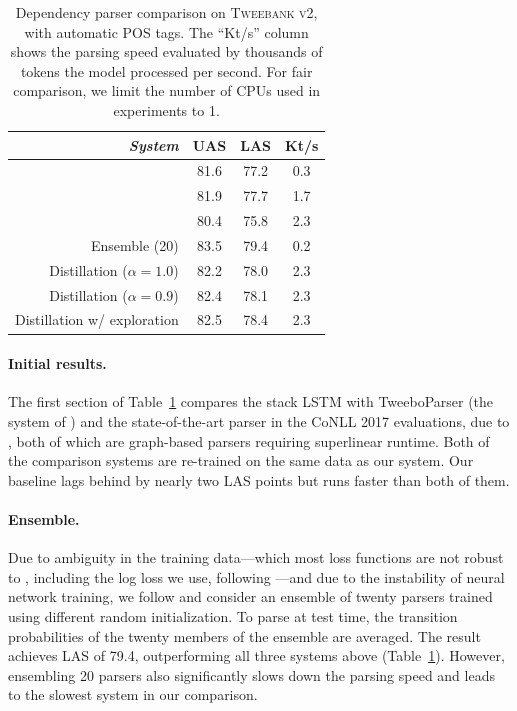 \documentclass[11pt,a4paper]{article}
\begin{document}
\begin{table}[t]
	\centering
	\begin{tabular}{rccc}
		\hline
		\it System & UAS & LAS & Kt/s \\
		\hline
		\citet{kong-EtAl:2014:EMNLP2014} &81.6 & 77.2 & 0.3 \\
		\citet{DBLP:journals/corr/DozatM16} & 81.9 &  77.7 & 1.7 \\
		\newcite{ballesteros-EtAl:2016:EMNLP2016} & 80.4 & 75.8 & 2.3 \\
		\hdashline
		Ensemble (20) & 83.5 & 79.4 & 0.2 \\
		Distillation ($\alpha =1.0$) & 82.2 & 78.0 & 2.3 \\
		Distillation ($\alpha =0.9$) & 82.4 & 78.1 & 2.3 \\		
		Distillation w/ exploration & 82.5 & 78.4 & 2.3 \\
		\hline
	\end{tabular}
	\caption{Dependency parser comparison on \textsc{Tweebank v2},
           with automatic POS tags. The ``Kt/s'' column shows
           the parsing speed evaluated by thousands of tokens
           the model processed per second. For fair comparison, we limit the
           number of CPUs used in \citet{DBLP:journals/corr/DozatM16} experiments to 1.
            \label{tbl:parse-result}}
\end{table}


\paragraph{Initial results.}  The first section of Table~\ref{tbl:parse-result} compares
the stack LSTM with {\sc TweeboParser} (the system 
of \citealp{kong-EtAl:2014:EMNLP2014}) and the state-of-the-art parser
in the CoNLL 2017 evaluations, due to
 \citet{DBLP:journals/corr/DozatM16}, both of which are graph-based
 parsers requiring superlinear runtime. 
Both of the comparison systems are re-trained on the same data as our
system.
Our baseline lags behind by nearly two LAS
points but runs faster than both of them.

\paragraph{Ensemble.}  Due to ambiguity in the training
data---which most loss functions are not robust to \citep{Frnay2014ClassificationIT}, including the log loss we use, following
\citet{ballesteros-dyer-smith:2015:EMNLP}---and due to the instability
of neural network training, we follow \citet{Dietterich2000} and
consider an ensemble of twenty parsers trained using different random
initialization.  To parse at test time, the transition probabilities of the twenty
members of the ensemble are averaged.  The result achieves LAS of
79.4, outperforming all three systems above (Table~\ref{tbl:parse-result}).
However, ensembling 20 parsers also significantly slows down the parsing
speed and leads to the slowest system in our comparison.
\end{document}
